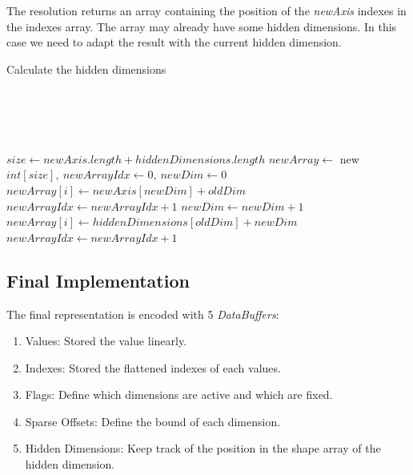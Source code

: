 The resolution returns an array containing the position of the \textit{newAxis} indexes in the indexes array. The array may already have some hidden dimensions. In this case we need to adapt the result with the current hidden dimension.

\begin{algorithm}
	\caption{Calculate the hidden dimensions}
	\label{alg:hiddenDim}
	\begin{algorithmic}
			
		\\
		\\
		
		\EndIf
		\\
		\EndIf
		\\	
		
	
		\State $size\gets newAxis.length + hiddenDimensions.length$ 	
		\State $newArray \gets $ new $int[size],\ newArrayIdx\gets 0,\ newDim\gets 0$
		\\
				\State $newArray[i] \gets newAxis[newDim] + oldDim$
				\State $newArrayIdx \gets newArrayIdx + 1 $
				\State $newDim \gets newDim + 1$	
			\EndWhile
			\State $newArray[i] \gets hiddenDimensions[oldDim] + newDim$	
			\State $newArrayIdx\gets newArrayIdx + 1$
		\EndFor
		\EndProcedure
	\end{algorithmic}
\end{algorithm}






\subsection{Final Implementation}
	
	The final representation is encoded with 5 \textit{DataBuffers}:
	\begin{enumerate}
		\item Values: Stored the value linearly.
		\item Indexes: Stored the flattened indexes of each values.
		\item Flags: Define which dimensions are active and which are fixed.
		\item Sparse Offsets: Define the bound of each dimension.
		\item Hidden Dimensions: Keep track of the position in the shape array of the hidden dimension.
	\end{enumerate}
	
